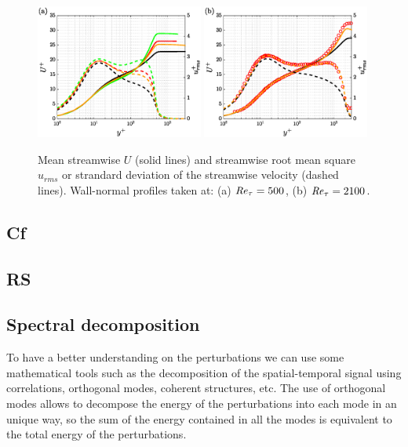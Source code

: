 \begin{figure}
    \centering
    \includegraphics[width=0.49\textwidth]{imgs/stats/U_uu_a.eps}
    \includegraphics[width=0.49\textwidth]{imgs/stats/U_uu_b.eps}
    \caption{Mean streamwise $U$ (solid lines) and streamwise root mean square $u_{rms}$ or strandard deviation of the streamwise velocity (dashed lines). Wall-normal profiles taken at: (a) $\mbox{\textit{Re}}_{\tau}=500$, (b) $\mbox{\textit{Re}}_{\tau}=2100$. }
    \label{fig:U_uu_cap2}
\end{figure}

\subsection{Cf}

\subsection{RS}


\subsection{Spectral decomposition}
To have a better understanding on the perturbations we can use some mathematical tools such as the decomposition of the spatial-temporal signal using correlations, orthogonal modes, coherent structures, etc.
The use of orthogonal modes allows to decompose the energy of the perturbations into each mode in an unique way, so the sum of the energy contained in all the modes is equivalent to the total energy of the perturbations. 

